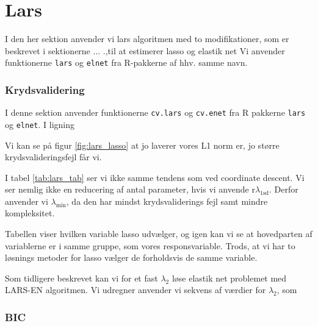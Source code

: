 \section{Lars}
I den her sektion anvender vi lars algoritmen med to modifikationer, som er beskrevet i sektionerne ... .,til at estimerer lasso og elastik net
Vi anvender funktionerne \texttt{lars} og \texttt{elnet} fra R-pakkerne af hhv. samme navn.

\subsubsection{Krydsvalidering}
I denne sektion anvender funktionerne  \texttt{cv.lars} og \texttt{cv.enet} fra R pakkerne \texttt{lars} og \texttt{elnet}. 
I ligning 

Vi kan se på figur \ref{fig:lars_lasso} at jo laverer vores L1 norm er, jo større krydsvalideringsfejl får vi.  


I tabel \ref{tab:lars_tab} ser vi ikke samme tendens som ved coordinate descent. 
Vi ser nemlig ikke en reducering af antal parameter, hvis vi anvende r$\lambda_{1\text{sd}}$.
Derfor anvender vi $\lambda_{\min}$, da den har mindst krydsvaliderings fejl samt mindre kompleksitet. 





Tabellen viser hvilken variable lasso udvælger, og igen kan vi se at hovedparten af variablerne er i samme gruppe, som vores responsvariable. 
Trods, at vi har to løsnings metoder for lasso vælger de forholdsvis de samme variable.



Som tidligere beskrevet kan vi for et fast $\lambda_2$ løse elastik net problemet med LARS-EN algoritmen. 
Vi udregner
anvender vi sekvens af værdier for $\lambda_2$, som 

\subsubsection{BIC}